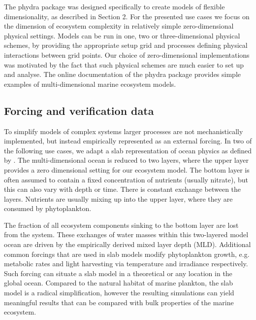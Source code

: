 \documentclass[journal abbreviation, manuscript]{copernicus}
\begin{document}
The phydra package was designed specifically to create models of flexible dimensionality, as described in Section 2. For the presented use cases we focus on the dimension of ecosystem complexity in relatively simple zero-dimensional physical settings. Models can be run in one, two or three-dimensional physical schemes, by providing the appropriate setup grid and processes defining physical interactions between grid points. Our choice of zero-dimensional implementations was motivated by the fact that such physical schemes are much easier to set up and analyse. The online documentation of the phydra package provides simple examples of multi-dimensional marine ecosystem models.\\




\subsection{Forcing and verification data} \label{ForcingSection}

To simplify models of complex systems larger processes are not mechanistically implemented, but instead empirically represented as an external forcing. In two of the following use cases, we adapt a slab representation of ocean physics as defined by \citet{Evans1985ACycles}. The multi-dimensional ocean is reduced to two layers, where the upper layer provides a zero dimensional setting for our ecosystem model. The bottom layer is often assumed to contain a fixed concentration of nutrients (usually nitrate), but this can also vary with depth or time. There is constant exchange between the layers. Nutrients are usually mixing up into the upper layer, where they are consumed by phytoplankton. 

The fraction of all ecosystem components sinking to the bottom layer are lost from the system. These exchanges of water masses within this two-layered model ocean are driven by the empirically derived mixed layer depth (MLD). Additional common forcings that are used in slab models modify phytoplankton growth, e.g. metabolic rates and light harvesting via temperature and irradiance respectively. Such forcing can situate a slab model in a theoretical or any location in the global ocean. Compared to the natural habitat of marine plankton, the slab model is a radical simplification, however the resulting simulations can yield meaningful results that can be compared with bulk properties of the marine ecosystem. 
\end{document}
